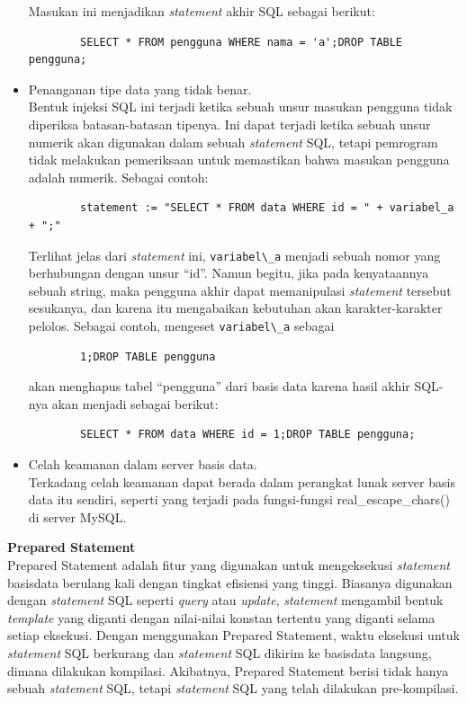 \begin{itemize}
	Masukan ini menjadikan \textit{statement} akhir SQL sebagai berikut:

	\begin{lstlisting}
		SELECT * FROM pengguna WHERE nama = 'a';DROP TABLE pengguna; 
	\end{lstlisting}
	\item Penanganan tipe data yang tidak benar.\\
	Bentuk injeksi SQL ini terjadi ketika sebuah unsur masukan pengguna tidak diperiksa batasan-batasan tipenya. Ini dapat terjadi ketika sebuah unsur numerik akan digunakan dalam sebuah \textit{statement} SQL, tetapi pemrogram tidak melakukan pemeriksaan untuk memastikan bahwa masukan pengguna adalah numerik. Sebagai contoh:
	
	\begin{lstlisting}
		statement := "SELECT * FROM data WHERE id = " + variabel_a + ";"
	\end{lstlisting}
	
	Terlihat jelas dari \textit{statement} ini, \verb!variabel\_a! menjadi sebuah nomor yang berhubungan dengan unsur ``id''. Namun begitu, jika pada kenyataannya sebuah string, maka pengguna akhir dapat memanipulasi \textit{statement} tersebut sesukanya, dan karena itu mengabaikan kebutuhan akan karakter-karakter pelolos. Sebagai contoh, mengeset \verb!variabel\_a! sebagai

	\begin{lstlisting}
		1;DROP TABLE pengguna
	\end{lstlisting}
	akan menghapus tabel ``pengguna'' dari basis data karena hasil akhir SQL-nya akan menjadi sebagai berikut:
	\begin{lstlisting}
		SELECT * FROM data WHERE id = 1;DROP TABLE pengguna;
	\end{lstlisting}
	
	\item Celah keamanan dalam server basis data.\\
	Terkadang celah keamanan dapat berada dalam perangkat lunak server basis data itu sendiri, seperti yang terjadi pada fungsi-fungsi real\_escape\_chars() di server MySQL.
\end{itemize}

\textbf{Prepared Statement}\\
Prepared Statement adalah fitur yang digunakan untuk mengeksekusi \textit{statement} basisdata berulang kali dengan tingkat efisiensi yang tinggi.  Biasanya digunakan dengan \textit{statement} SQL seperti \textit{query} atau \textit{update}, \textit{statement} mengambil bentuk \textit{template} yang diganti dengan nilai-nilai konstan tertentu yang diganti selama setiap eksekusi. Dengan menggunakan Prepared Statement, waktu eksekusi untuk \textit{statement} SQL berkurang dan \textit{statement} SQL dikirim ke basisdata langsung, dimana dilakukan kompilasi. Akibatnya, Prepared Statement berisi tidak hanya sebuah \textit{statement} SQL, tetapi \textit{statement} SQL yang telah dilakukan pre-kompilasi.

